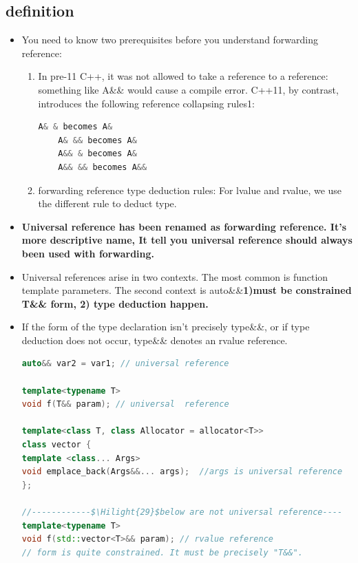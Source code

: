\documentclass[a4paper,11pt,twoside]{book}
\newcommand{\Hilight}[1]{\makebox[0pt][l]{\color{yellow}\rule[-3pt]{#1em}{11pt}}}
\newcommand{\Hilight}[1]{}
\begin{document}
\subsection{definition}
\begin{itemize}
\item You need to know two prerequisites before you understand forwarding reference:

\begin{enumerate}
	\item In pre-11 C++, it was not allowed to take a reference to a reference: something like A\&\& would cause a compile error. C++11, by contrast, introduces the following reference collapsing rules1:
	
	\begin{lstlisting}[frame=single, language=c++]
	A& & becomes A&
	A& && becomes A&
	A&& & becomes A&
	A&& && becomes A&&
	\end{lstlisting}
	
	\item forwarding reference type deduction rules: For lvalue and rvalue, we use the different rule to deduct type.
\end{enumerate}

\item \textbf{Universal reference has been renamed as forwarding reference. It's more descriptive name, It tell you universal reference should always been used with forwarding.}

\item  Universal references arise in two contexts. The most common is function template parameters. The second context is auto\&\&\textbf{1)must be constrained T\&\& form, 2) type deduction happen.}

\item If the form of the type declaration isn't precisely type\&\&, or if type deduction does not occur, type\&\& denotes an rvalue reference.
\begin{lstlisting}[frame=single, language=c++, mathescape=true]
auto&& var2 = var1; // universal reference

template<typename T>
void f(T&& param); // universal  reference

template<class T, class Allocator = allocator<T>>
class vector {
template <class... Args>
void emplace_back(Args&&... args);  //args is universal reference
};

//------------$\Hilight{29}$below are not universal reference----
template<typename T>
void f(std::vector<T>&& param); // rvalue reference
// form is quite constrained. It must be precisely "T&&".


\end{lstlisting}
\end{itemize}
\end{document}
